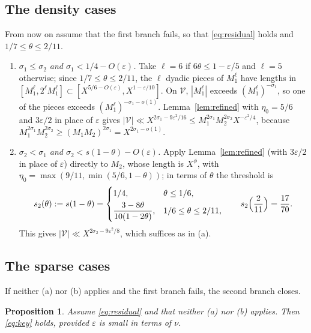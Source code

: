 \documentclass[11pt,a4paper]{amsart}
\newtheorem{proposition}[theorem]{Proposition}
\theoremstyle{definition}
\newcommand{\e}{\varepsilon}
\newcommand{\1}{\mathbf 1}
\newcommand{\cV}{\mathcal V}
\begin{document}
\subsection{The density cases}
From now on assume that the first branch fails, so that \eqref{eq:residual}
holds and \(1/7\le\theta\le2/11\).
\begin{enumerate}[label=(\alph*),leftmargin=*]
\item \emph{\(\sigma_1\le\sigma_2\) and \(\sigma_1<1/4-O(\e)\).}  Take
\(\ell=6\) if \(6\theta\le1-\e/5\) and \(\ell=5\) otherwise; since
\(1/7\le\theta\le2/11\), the \(\ell\) dyadic pieces of \(M_1^\ell\) have
lengths in \([M_1^\ell,2^\ell M_1^\ell]\subset[X^{5/6-O(\e)},X^{1-\e/10}]\).
On \(\cV\), \(|M_1^\ell|\) exceeds \((M_1^\ell)^{-\sigma_1}\), so one of the
pieces exceeds \((M_1^\ell)^{-\sigma_1-o(1)}\).  Lemma~\ref{lem:refined}
with \(\eta_0=5/6\) and \(3\e/2\) in place of \(\e\) gives
\(|\cV|\ll X^{2\sigma_1-9\e^2/16}\le M_1^{2\sigma_1}M_2^{2\sigma_2}X^{-\e^2/4}\),
because \(M_1^{2\sigma_1}M_2^{2\sigma_2}\ge(M_1M_2)^{2\sigma_1}
=X^{2\sigma_1-o(1)}\).
\item \emph{\(\sigma_2<\sigma_1\) and \(\sigma_2<s(1-\theta)-O(\e)\).}
Apply Lemma~\ref{lem:refined} (with \(3\e/2\) in place of \(\e\)) directly
to \(M_2\), whose length is \(X^\phi\), with
\(\eta_0=\max(9/11,\min(5/6,1-\theta))\); in terms of \(\theta\) the
threshold is
\[
 s_2(\theta):=s(1-\theta)=
 \begin{cases}
 1/4, & \theta\le1/6,\\[1mm]
 \dfrac{3-8\theta}{10(1-2\theta)}, & 1/6\le\theta\le2/11,
 \end{cases}
 \qquad s_2\Bigl(\frac2{11}\Bigr)=\frac{17}{70}.
\]
This gives \(|\cV|\ll X^{2\sigma_2-9\e^2/8}\), which suffices as in (a).
\end{enumerate}

\subsection{The sparse cases}
If neither (a) nor (b) applies and the first branch fails, the second
branch closes.

\begin{proposition}\label{prop:bins}
Assume \eqref{eq:residual} and that neither (a) nor (b) applies.  Then
\eqref{eq:key} holds, provided \(\e\) is small in terms of \(\nu\).
\end{proposition}
\end{document}
